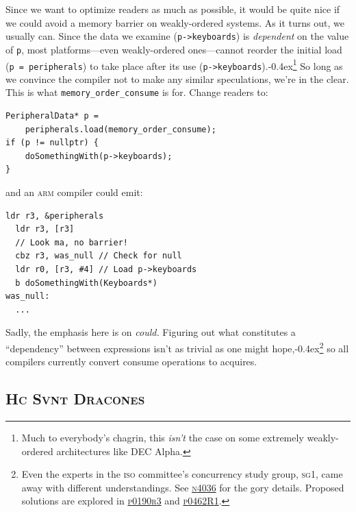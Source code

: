 \documentclass[fontsize=10pt, numbers=endperiod]{scrartcl}
\newcommand{\codesize}{\fontsize{10pt}{12pt}}
\newcommand{\punckern}{\kern-0.4ex}
\newcommand{\monobox}[1]{\mbox{\texttt{#1}}}
\newenvironment{colfigure}
  {\par\vspace{1\baselineskip minus 0.5\baselineskip}\noindent\minipage{\linewidth}}
  {\endminipage\vspace*{1\baselineskip minus 0.7\baselineskip}}
\begin{document}
\begin{multicols*}{2}
Since we want to optimize readers as much as possible,
it would be quite nice if we could avoid a memory barrier
on weakly-ordered systems.
As it turns out, we usually can.
Since the data we examine (\texttt{p->keyboards})
is \emph{dependent} on the value of \texttt{p},
most platforms---even weakly-ordered ones---cannot reorder the initial
load (\texttt{p = peripherals}) to take place after its use
(\texttt{p->keyboards}).\punckern\footnote{Much to everybody's chagrin,
this \emph{isn't} the case on some extremely weakly-ordered architectures like
DEC Alpha.}
So long as we convince the compiler not to make any similar speculations,
we're in the clear.
This is what \monobox{memory\_order\_consume} is for.
Change readers to:
\begin{colfigure}
\begin{verbatim}
PeripheralData* p =
    peripherals.load(memory_order_consume);
if (p != nullptr) {
    doSomethingWith(p->keyboards);
}
\end{verbatim}
\end{colfigure}
and an \textsc{arm} compiler could emit:
\begin{colfigure}
\begin{lstlisting}[language={[ARM]Assembler}]
  ldr r3, &peripherals
  ldr r3, [r3]
  // Look ma, no barrier!
  cbz r3, was_null // Check for null
  ldr r0, [r3, #4] // Load p->keyboards
  b doSomethingWith(Keyboards*)
was_null:
  ...
\end{lstlisting}
\end{colfigure}

Sadly, the emphasis here is on \emph{could.}
Figuring out what constitutes a ``dependency'' between expressions isn't
as trivial as one might hope,\punckern\footnote{Even the experts in
the \textsc{iso} committee's concurrency study group, \textsc{sg}1,
came away with different understandings.
See
\href{http://www.open-std.org/jtc1/sc22/wg21/docs/papers/2014/n4036.pdf}{\textsc{n}4036}
for the gory details.
Proposed solutions are explored in
\href{http://www.open-std.org/jtc1/sc22/wg21/docs/papers/2017/p0190r3.pdf}{\textsc{p}0190\textsc{r}3}
and
\href{http://www.open-std.org/jtc1/sc22/wg21/docs/papers/2017/p0462r1.pdf}{\textsc{p}0462\textsc{R}1}.
}
so all compilers currently convert consume operations to acquires.

\subsection{\textsc{Hc Svnt Dracones}}


\end{multicols*}
\end{document}
